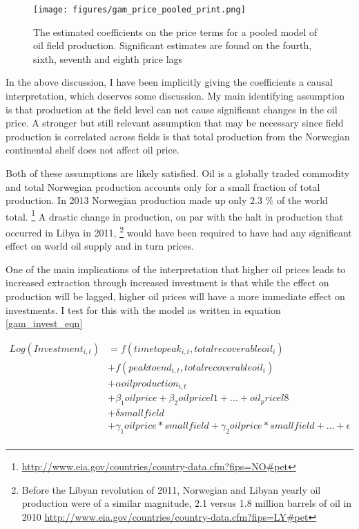 \documentclass[12pt]{article}
\begin{document}
\begin{figure}
	\texttt{[image: figures/gam\_price\_pooled\_print.png]}
	\caption{The estimated coefficients on the price terms for a pooled model of oil field production.  Significant estimates are found on the fourth, sixth, seventh and eighth price lags}
	\label{gam_price_pooled}
\end{figure}

In the above discussion, I have been implicitly giving the coefficients a causal interpretation, which deserves some discussion.  My main identifying assumption is that production at the field level can not cause significant changes in the oil price.  A stronger but still relevant assumption that may be necessary since field production is correlated across fields is that total production from the Norwegian continental shelf does not affect oil price.  

Both of these assumptions are likely satisfied.  Oil is a globally traded commodity and total Norwegian production accounts only for a small fraction of total production.  In 2013 Norwegian production made up only 2.3 \% of the world total. \footnote{\url{http://www.eia.gov/countries/country-data.cfm?fips=NO#pet}}  A drastic change in production, on par with the halt in production that occurred in Libya in 2011, \footnote{Before the Libyan revolution of 2011, Norwegian and Libyan yearly oil production were of a similar magnitude, 2.1 versus 1.8 million barrels of oil in 2010 \url{http://www.eia.gov/countries/country-data.cfm?fips=LY#pet}} would have been required to have had any significant effect on world oil supply and in turn prices. 

One of the main implications of the interpretation that higher oil prices leads to increased extraction through increased investment is that while the effect on production will be lagged, higher oil prices will have a more immediate effect on investments.  I test for this with the model as written in equation \ref{gam_invest_eqn}

\begin{equation}
\begin{split}
	Log(Investment_{i,t})&=f(timetopeak_{i,t}, totalrecoverableoil_i) \\
	 \quad &+ f(peaktoend_{i,t}, totalrecoverableoil_i) \\
	 \quad &+ \alpha oilproduction_{i,t} \\
	 \quad & + \beta_1 oilprice + \beta_2 oilpricel1 + ... + oil_pricel8 \\
	 \quad &+ \delta smallfield \\
	 \quad &+ \gamma_1 oilprice*smallfield + \gamma_2 oilprice*smallfield + ... 
	+  \epsilon \\
\label{gam_invest_eqn}
\end{split}
\end{equation}
\end{document}
